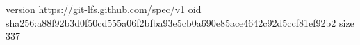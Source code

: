version https://git-lfs.github.com/spec/v1
oid sha256:a88f92b3d0f50cd555a06f2bfba93e5cb0a690e85ace4642c92d5ccf81ef92b2
size 337
